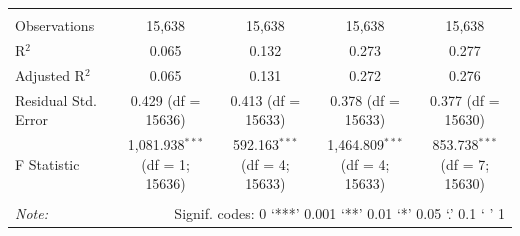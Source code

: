\begin{tabular}{@{\extracolsep{2pt}}lcccc}
\hline \\[-1.8ex] 
Observations & 15,638 & 15,638 & 15,638 & 15,638 \\ 
R$^{2}$ & 0.065 & 0.132 & 0.273 & 0.277 \\ 
Adjusted R$^{2}$ & 0.065 & 0.131 & 0.272 & 0.276 \\ 
Residual Std. Error & 0.429 (df = 15636) & 0.413 (df = 15633) & 0.378 (df = 15633) & 0.377 (df = 15630) \\ 
F Statistic & 1,081.938$^{***}$ (df = 1; 15636) & 592.163$^{***}$ (df = 4; 15633) & 1,464.809$^{***}$ (df = 4; 15633) & 853.738$^{***}$ (df = 7; 15630) \\ 
\hline 
\hline \\[-1.8ex] 
\textit{Note:}  & \multicolumn{4}{r}{Signif. codes:  0 ‘***’ 0.001 ‘**’ 0.01 ‘*’ 0.05 ‘.’ 0.1 ‘ ’ 1} \\ 
\end{tabular} 
\endgroup 
